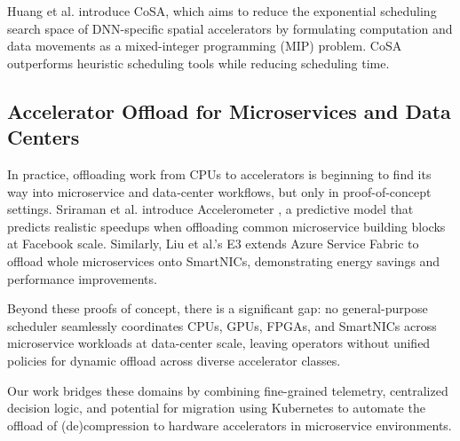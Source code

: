 Huang et al. \cite{huangCoSAScheduling2021} introduce CoSA, which aims to reduce the exponential scheduling search space of DNN-specific spatial accelerators by formulating computation and data movements as a mixed-integer programming (MIP) problem.
CoSA outperforms heuristic scheduling tools while reducing scheduling time.

\subsection{Accelerator Offload for Microservices and Data Centers}

In practice, offloading work from CPUs to accelerators is beginning to find its way into microservice and data‐center workflows, but only in proof-of-concept settings.
Sriraman et al. introduce Accelerometer \cite{sriramanAccelerometerUnderstanding2020}, a predictive model that predicts realistic speedups when offloading common microservice building blocks at Facebook scale.
Similarly, Liu et al.'s E3 \cite{liuE3EnergyEfficient2019} extends Azure Service Fabric to offload whole microservices onto SmartNICs, demonstrating energy savings and performance improvements.

Beyond these proofs of concept, there is a significant gap: no general-purpose scheduler seamlessly coordinates CPUs, GPUs, FPGAs, and SmartNICs across microservice workloads at data-center scale, leaving operators without unified policies for dynamic offload across diverse accelerator classes.

Our work bridges these domains by combining fine-grained telemetry, centralized decision logic, and potential for migration using Kubernetes to automate the offload of (de)compression to hardware accelerators in microservice environments.
